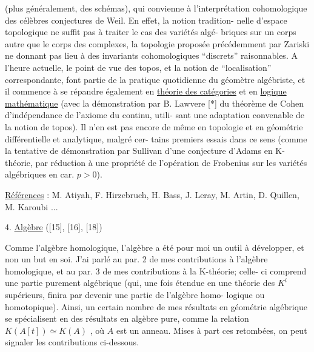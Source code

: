\documentclass[11pt]{article}
\newcommand{\scanpage}[1]{\par\bigskip\noindent{\small\sffamily[scan #1]}\par}
\newcommand{\mspage}[1]{{\small\sffamily[p.\,#1]}}
\newcommand{\hand}[1]{\textcolor{blue}{#1}}
\newcommand{\uline}[1]{\underline{#1}}
\begin{document}
\mspage{\hand{197}}

\clearpage
\scanpage{119/198}
\mspage{- 3 -}

(plus généralement, des schémas), qui convienne à l'interprétation
cohomologique des célèbres conjectures de Weil. En effet, la notion tradition-%
nelle d'espace topologique ne suffit pas à traiter le cas des variétés algé-%
briques sur un corps autre que le corps des complexes, la topologie proposée
précédemment par Zariski ne donnant pas lieu à des invariants cohomologiques
``discrets'' raisonnables. A l'heure actuelle, le point de vue des topos, et la
notion de ``localisation'' correspondante, font partie de la pratique quotidienne
du géomètre algébriste, et il commence à se répandre également en
\uline{théorie des catégories} et en \uline{logique mathématique} (avec la démonstration par B.
Lawvere [*] du théorème de Cohen d'indépendance de l'axiome du continu, utili-%
sant une adaptation convenable de la notion de topos). Il n'en est pas encore
de même en topologie et en géométrie différentielle et analytique, malgré cer-%
tains premiers essais dans ce sens (comme la tentative de démonstration par
Sullivan d'une conjecture d'Adams en K-théorie, par réduction à une propriété
de l'opération de Frobenius sur les variétés algébriques en car. $p > 0$).

\uline{Références} : M. Atiyah, F. Hirzebruch, H. Bass, J. Leray, M. Artin, D. Quillen,
M. Karoubi ...

4. \uline{Algèbre} ([15], [16], [18])

Comme l'algèbre homologique, l'algèbre a été pour moi un outil à
développer, et non un but en soi. J'ai parlé au par. 2 de mes contributions à
l'algèbre homologique, et au par. 3 de mes contributions à la K-théorie; celle-%
ci comprend une partie purement algébrique (qui, une fois étendue en une
théorie des $K^{i}$ supérieurs, finira par devenir une partie de l'algèbre homo-%
logique ou homotopique). Ainsi, un certain nombre de mes résultats en géométrie
algébrique se spécialisent en des résultats en algèbre pure, comme la relation
$K(A[t]) \simeq K(A)$ , où $A$ est un anneau. Mises à part ces retombées, on peut
signaler les contributions ci-dessous.
\end{document}
